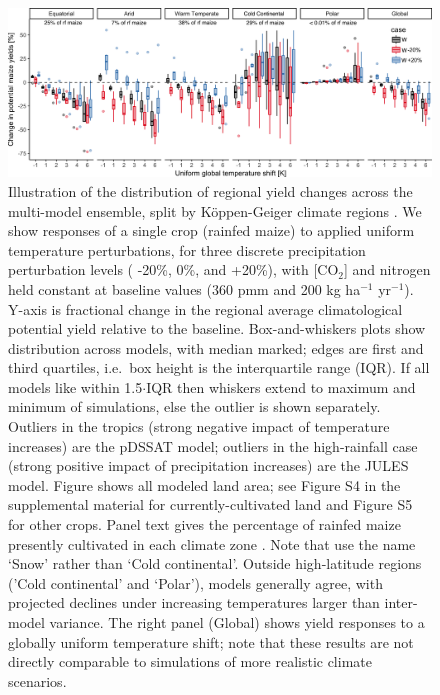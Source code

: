 \documentclass[gmd, manuscript]{copernicus} %
\begin{document}
\begin{figure}[ht]
\centering
   \includegraphics[width=15cm]{figures/global_sim_CG.png}
   \caption{Illustration of the distribution of regional yield changes across the multi-model ensemble, split by K\"{o}ppen-Geiger climate regions \citep{rubel2010}. 
   We show responses of a single crop (rainfed maize) to applied uniform temperature perturbations, for three discrete precipitation perturbation levels ( -20\%, 0\%, and +20\%), with [CO$_2$] and nitrogen held constant at baseline values (360 pmm and 200 kg ha$^{-1}$ yr$^{-1}$). 
	Y-axis is fractional change in the regional average climatological potential yield relative to the baseline. Box-and-whiskers plots show distribution across models, with median marked; edges are first and third quartiles, i.e.\ box height is the interquartile range (IQR). 
	If all models like within 1.5$\cdot$IQR then whiskers extend to maximum and minimum of simulations, else the outlier is shown separately. Outliers in the tropics (strong negative impact of temperature increases) are the pDSSAT model; outliers in the high-rainfall case (strong positive impact of precipitation increases) are the JULES model. 
	Figure shows all modeled land area; see Figure S4 in the supplemental material for currently-cultivated land and Figure S5 for other crops. Panel text gives the percentage of rainfed maize presently cultivated in each climate zone \citep[data from][]{Portmann2010}. 
	Note that \citet{rubel2010} use the name `Snow' rather than `Cold continental'. 
	Outside high-latitude regions ('Cold continental' and `Polar'), models generally agree, with projected declines under increasing temperatures larger than inter-model variance. 
	The right panel (Global) shows yield responses to a globally uniform temperature shift; note that these results are not directly comparable to simulations of more realistic climate scenarios.}
   \label{fig:globesim}
\end{figure}
\end{document}
